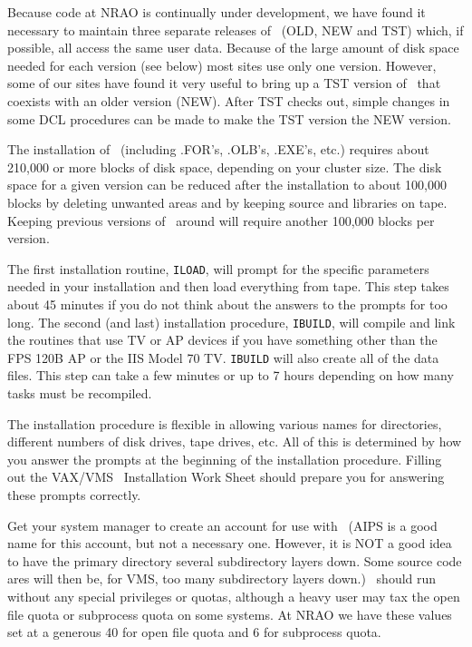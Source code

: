 Because code at NRAO is continually under development, we have found it
necessary to maintain three separate releases of \aips\ (OLD, NEW and
TST) which, if possible, all access the same user data.  Because of the
large amount of disk space needed for each version (see below) most
sites use only one version.  However, some of our sites have found it
very useful to bring up a TST version of \aips\ that coexists with an
older version (NEW).  After TST checks out, simple changes in some DCL
procedures can be made to make the TST version the NEW version.

The installation of \aips\  (including .FOR's, .OLB's, .EXE's, etc.)
requires about 210,000 or more blocks of disk space, depending on your
cluster size.  The disk space for a given version can be reduced after
the installation to about 100,000 blocks by deleting unwanted areas and
by keeping source and libraries on tape.  Keeping previous versions of
\aips\ around will require another 100,000 blocks per version.

The first installation routine, {\tt ILOAD}, will prompt for the specific
parameters needed in your installation and then load everything from
tape.  This step takes about 45 minutes if you do not think about the
answers to the prompts for too long.  The second (and last)
installation procedure, {\tt IBUILD}, will compile and link the routines that
use TV or AP devices if you have something other than the FPS 120B AP
or the IIS Model 70 TV.  {\tt IBUILD} will also create all of the data
files.  This step can take a few minutes or up to 7 hours depending on
how many tasks must be recompiled.

The installation procedure is flexible in allowing various names for
directories, different numbers of disk drives, tape drives, etc.  All
of this is determined by how you answer the prompts at the beginning of
the installation procedure.  Filling out the VAX/VMS \aips\ Installation
Work Sheet should prepare you for answering these prompts correctly.

\bigskip{}


Get your system manager to create an account for use with \aips\ (AIPS is
a good name for this account, but not a necessary one.  However, it is
NOT a good idea to have the primary directory several subdirectory
layers down.  Some source code ares will then be, for VMS, too many
subdirectory layers down.) \aips\ should run without any special
privileges or quotas, although a heavy user may tax the open file quota
or subprocess quota on some systems.  At NRAO we have these values set
at a generous 40 for open file quota and 6 for subprocess quota.

